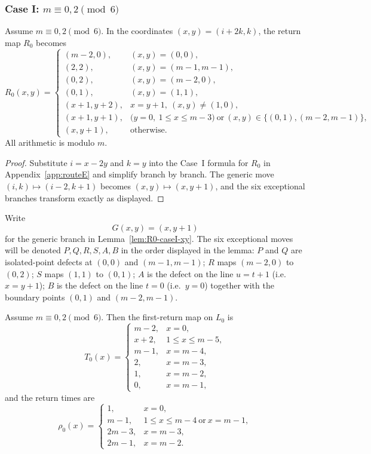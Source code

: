 \subsubsection{Case I: $m\equiv 0,2\pmod 6$}

\begin{lemma}\label{lem:R0-caseI-xy}
Assume $m\equiv 0,2\pmod 6$.
In the coordinates $(x,y)=(i+2k,k)$, the return map $R_0$ becomes
\[
R_0(x,y)=
\begin{cases}
(m-2,0),&(x,y)=(0,0),\\
(2,2),&(x,y)=(m-1,m-1),\\
(0,2),&(x,y)=(m-2,0),\\
(0,1),&(x,y)=(1,1),\\
(x+1,y+2),&x=y+1,\ (x,y)\neq (1,0),\\
(x+1,y+1),&\bigl(y=0,\ 1\le x\le m-3\bigr)\ \text{or}\ (x,y)\in\{(0,1),(m-2,m-1)\},\\
(x,y+1),&\text{otherwise}.
\end{cases}
\]
All arithmetic is modulo $m$.
\end{lemma}

\begin{proof}
Substitute $i=x-2y$ and $k=y$ into the Case~I formula for $R_0$ in Appendix~\ref{app:routeE} and simplify branch by
branch.
The generic move $(i,k)\mapsto(i-2,k+1)$ becomes $(x,y)\mapsto(x,y+1)$, and the six exceptional
branches transform exactly as displayed.
\end{proof}

Write
\[
G(x,y)=(x,y+1)
\]
for the generic branch in Lemma~\ref{lem:R0-caseI-xy}.
The six exceptional moves will be denoted $P,Q,R,S,A,B$ in the order displayed in the lemma:
$P$ and $Q$ are isolated-point defects at $(0,0)$ and $(m-1,m-1)$;
$R$ maps $(m-2,0)$ to $(0,2)$;
$S$ maps $(1,1)$ to $(0,1)$;
$A$ is the defect on the line $u=t+1$ (i.e.\ $x=y+1$);
$B$ is the defect on the line $t=0$ (i.e.\ $y=0$) together with the boundary points $(0,1)$ and $(m-2,m-1)$.

\begin{proposition}\label{prop:R0-caseI-data}
Assume $m\equiv 0,2\pmod 6$.
Then the first-return map on $L_0$ is
\[
T_0(x)=
\begin{cases}
m-2,&x=0,\\
x+2,&1\le x\le m-5,\\
m-1,&x=m-4,\\
2,&x=m-3,\\
1,&x=m-2,\\
0,&x=m-1,
\end{cases}
\]
and the return times are
\[
\rho_0(x)=
\begin{cases}
1,&x=0,\\
m-1,&1\le x\le m-4\ \text{or}\ x=m-1,\\
2m-3,&x=m-3,\\
2m-1,&x=m-2.
\end{cases}
\]
\end{proposition}


